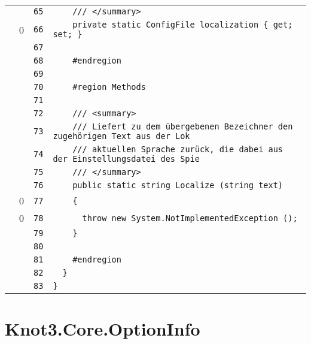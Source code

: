 \documentclass[a4paper,10pt]{article}
\begin{document}
\begin{longtable}[l]{lrrl}
\cellcolor{gray} &  & \verb~65~ & \verb~    /// </summary>~\\
\cellcolor{red} & 0 & \verb~66~ & \verb~    private static ConfigFile localization { get; set; }~\\
\cellcolor{gray} &  & \verb~67~ & \verb~~\\
\cellcolor{gray} &  & \verb~68~ & \verb~    #endregion~\\
\cellcolor{gray} &  & \verb~69~ & \verb~~\\
\cellcolor{gray} &  & \verb~70~ & \verb~    #region Methods~\\
\cellcolor{gray} &  & \verb~71~ & \verb~~\\
\cellcolor{gray} &  & \verb~72~ & \verb~    /// <summary>~\\
\cellcolor{gray} &  & \verb~73~ & \verb~    /// Liefert zu dem übergebenen Bezeichner den zugehörigen Text aus der Lok~\\
\cellcolor{gray} &  & \verb~74~ & \verb~    /// aktuellen Sprache zurück, die dabei aus der Einstellungsdatei des Spie~\\
\cellcolor{gray} &  & \verb~75~ & \verb~    /// </summary>~\\
\cellcolor{gray} &  & \verb~76~ & \verb~    public static string Localize (string text)~\\
\cellcolor{red} & 0 & \verb~77~ & \verb~    {~\\
\cellcolor{red} & 0 & \verb~78~ & \verb~      throw new System.NotImplementedException ();~\\
\cellcolor{gray} &  & \verb~79~ & \verb~    }~\\
\cellcolor{gray} &  & \verb~80~ & \verb~~\\
\cellcolor{gray} &  & \verb~81~ & \verb~    #endregion~\\
\cellcolor{gray} &  & \verb~82~ & \verb~  }~\\
\cellcolor{gray} &  & \verb~83~ & \verb~}~\\
\end{longtable}
\newpage
\section{Knot3.Core.OptionInfo}
\end{document}
